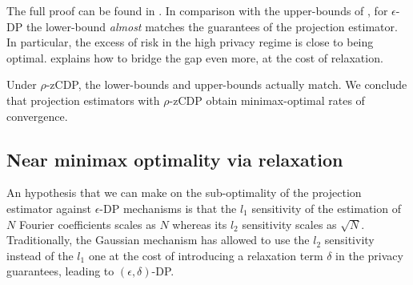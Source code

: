 \documentclass[10pt]{article} %
\newcommand\mech[1]{\mathfrak{#1}}
\newcommand\p[1]{\left( {#1}\right)}
\newcommand\RG[1]{\textcolor{red}{#1}}
\newcommand\mRG[1]{\marginpar{\tiny\RG{#1}}}
\newcommand\CL[1]{\textcolor{blue}{#1}}
\begin{document}
The full proof can be found in .
In comparison with the upper-bounds of , for $\epsilon$-DP the lower-bound \emph{almost} matches the guarantees of the projection estimator. In particular, the excess of risk in the high privacy regime is close to being optimal.  explains how to bridge the gap even more, at the cost of relaxation. 

Under $\rho$-zCDP,  %
the lower-bounds and upper-bounds actually match. We conclude that projection estimators with $\rho$-zCDP obtain minimax-optimal rates of convergence.

\subsection{Near minimax optimality via relaxation}
\label{sec:relaxation}

An hypothesis that we can make on the sub-optimality of the projection estimator against $\epsilon$-DP mechanisms is that the $l_1$%
sensitivity of the estimation of $N$ Fourier coefficients scales as $N$ whereas its $l_2$ sensitivity scales as $\sqrt{N}$. Traditionally, the Gaussian mechanism \citep{dwork2006our,dwork2006calibrating} has allowed to use the $l_2$ sensitivity instead of the $l_1$ one at the cost of introducing a relaxation term $\delta$ in the privacy guarantees, leading to $(\epsilon, \delta)$-DP.

\end{document}

